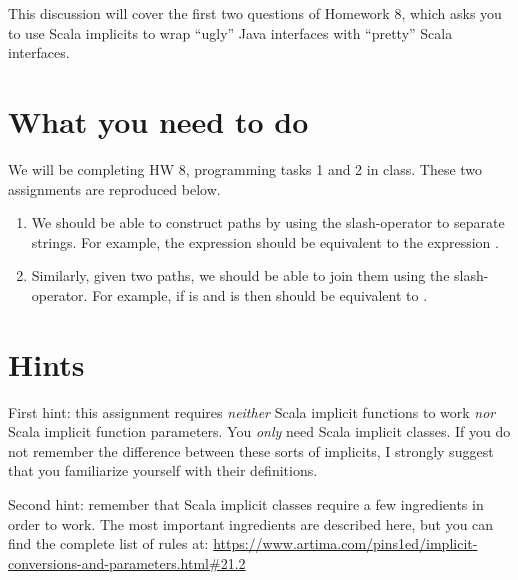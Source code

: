 \documentclass[9pt]{extbook}
\begin{document}







This discussion will cover the first two questions of Homework 8, which asks you to use Scala implicits to wrap ``ugly'' Java interfaces with ``pretty'' Scala interfaces.

\section{What you need to do}

We will be completing HW 8, programming tasks 1 and 2 in class.  These two assignments are reproduced below.

\begin{enumerate}

  \item We should be able to construct paths by using the slash-operator to separate strings. For example, the expression  should be equivalent to the expression . 
  \item Similarly, given two paths, we should be able to join them using the slash-operator. For example, if  is  and  is  then  should be equivalent to . 
\end{enumerate}

\section{Hints}

First hint: this assignment requires \emph{neither} Scala implicit functions to work \emph{nor} Scala implicit function parameters.  You \emph{only} need Scala implicit classes.  If you do not remember the difference between these sorts of implicits, I strongly suggest that you familiarize yourself with their definitions.

Second hint: remember that Scala implicit classes require a few ingredients in order to work.  The most important ingredients are described here, but you can find the complete list of rules at: \url{https://www.artima.com/pins1ed/implicit-conversions-and-parameters.html#21.2}
\end{document}

